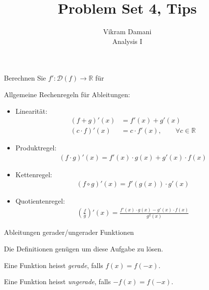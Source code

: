 \documentclass[12pt]{article}
\newcommand{\R}{\mathbb{R}} %
\newenvironment{definition}[2][Definition]{\begin{trivlist}
        \item[\hskip \labelsep {\bfseries #1}\hskip \labelsep {\bfseries #2.}]}{\end{trivlist}}
\newenvironment{problem}[2][Tipps \& Tricks zu]{\begin{trivlist}
        \item[\hskip \labelsep {\bfseries #1}\hskip \labelsep {\bfseries #2.}]}{\end{trivlist}}
\newenvironment{question}[2][Aufgabe]{\begin{trivlist}
        \item[\hskip \labelsep {\bfseries #1}\hskip \labelsep {\bfseries #2.}]}{\end{trivlist}}
\begin{document}
\title{Problem Set 4, Tips}
\author{Vikram Damani\\
    Analysis I}

\maketitle

\begin{question}{1}
    Berechnen Sie $f':\mathcal{D}(f)\to\R$ für
\end{question}

\begin{problem}{1}
Allgemeine Rechenregeln für Ableitungen:
\begin{itemize}
    \item Linearität:
          \begin{align}
              (f+g)'(x)       & =f'(x)+g'(x)                          \\
              (c\cdot{f})'(x) & =c\cdot{f}'(x), \qquad\forall{c}\in\R
          \end{align}
    \item Produktregel:
          \begin{align}
              (f\cdot{g})'(x) =f'(x)\cdot{g}(x)+g'(x)\cdot{f}(x)
          \end{align}
    \item Kettenregel:
          \begin{align}
              (f\circ{g})'(x) =f'(g(x))\cdot{g}'(x)
          \end{align}
    \item Quotientenregel:
          \begin{align}
              \left(\frac{f}{g}\right)'(x) =\frac{f'(x)\cdot{g}(x)-g'(x)\cdot{f}(x)}{g^2(x)}
          \end{align}
\end{itemize}
\end{problem}

\begin{question}{2}
    Ableitungen gerader/ungerader Funktionen
\end{question}

\begin{problem}{2}
Die Definitionen genügen um diese Aufgabe zu lösen.
\begin{definition}{[Gerade Funktion]}
    Eine Funktion heisst \textit{gerade}, falls $f(x)=f(-x)$.
\end{definition}
\begin{definition}{[Ungerade Funktion]}
    Eine Funktion heisst \textit{ungerade}, falls $-f(x)=f(-x)$.
\end{definition}
\end{problem}
\end{document}
